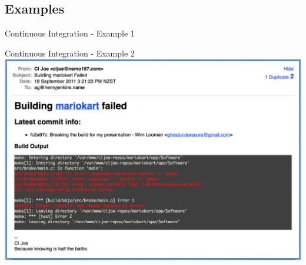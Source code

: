 \documentclass[xcolor=dvipsnames]{beamer}
\begin{document}
    \subsection{Examples}
      \begin{frame}{Continuous Integration - Example 1}
      \end{frame}

      \begin{frame}{Continuous Integration - Example 2}
        \includegraphics[width=\linewidth]{images/email}
      \end{frame}
\end{document}
